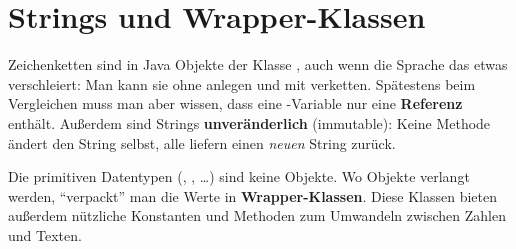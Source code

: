 \section{Strings und Wrapper-Klassen}\label{sec:strings}
\worum
Zeichenketten sind in Java Objekte der Klasse , auch wenn die Sprache das etwas verschleiert: Man kann sie ohne  anlegen und mit \code{+} verketten. Spätestens beim Vergleichen muss man aber wissen, dass eine -Variable nur eine \textbf{Referenz} enthält. Außerdem sind Strings \textbf{unveränderlich} (immutable): Keine Methode ändert den String selbst, alle liefern einen \emph{neuen} String zurück.

Die primitiven Datentypen (, , \ldots) sind keine Objekte. Wo Objekte verlangt werden, \enquote{verpackt} man die Werte in \textbf{Wrapper-Klassen}. Diese Klassen bieten außerdem nützliche Konstanten und Methoden zum Umwandeln zwischen Zahlen und Texten.

